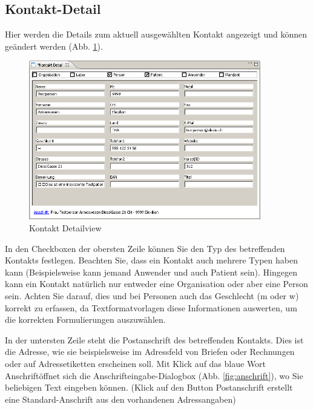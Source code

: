 \subsection{Kontakt-Detail}
Hier werden die Details zum aktuell ausgewählten Kontakt angezeigt und können
geändert werden (Abb. \ref{fig:kontaktdetail}).
\begin{figure}[htp]
\begin{center}
  \includegraphics[width=0.9\textwidth]{images/kontaktdetail}
  \caption{Kontakt Detailview}
  \label{fig:kontaktdetail}
\end{center}
\end{figure}
In den Checkboxen der obersten Zeile können Sie den Typ des betreffenden
Kontakts festlegen. Beachten Sie, dass ein Kontakt auch mehrere Typen haben kann
(Beispielsweise kann jemand Anwender und auch Patient sein). Hingegen kann
ein Kontakt natürlich nur entweder eine Organisation oder aber eine Person sein.
Achten Sie darauf, dies und bei Personen auch das Geschlecht (m oder w) korrekt
zu erfassen, da Textformatvorlagen diese Informationen auswerten, um die
korrekten Formulierungen auszuwählen.

In der untersten Zeile steht die Postanschrift des betreffenden Kontakts. Dies
ist die Adresse, wie sie beispielsweise im Adressfeld von Briefen oder
Rechnungen oder auf Adressetiketten erscheinen soll. Mit Klick auf das blaue
Wort \glqq Anschrift\grqq{}öffnet sich die Anschrifteingabe-Dialogbox (Abb.
\ref{fig:anschrift}), wo Sie beliebigen Text eingeben können. (Klick auf den
Button \glqq Postanschrift\grqq{} erstellt eine Standard-Anschrift aus den
vorhandenen Adressangaben)


